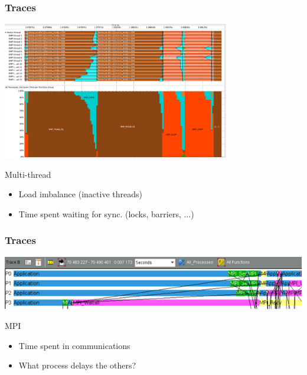 \documentclass[xcolor={x11names,svgnames}]{beamer}
\begin{document}
\begin{frame}
  \frametitle{Traces}

  \begin{center}
    \includegraphics[height=6cm]{vampir.png}
  \end{center}

\begin{block}{Multi-thread}
    \begin{itemize}
    \item Load imbalance (inactive threads)
    \item Time spent waiting for sync. (locks, barriers, ...)
    \end{itemize}
  \end{block}
  
\end{frame}


\begin{frame}
  \frametitle{Traces}

  \includegraphics[width=\textwidth]{trace_mpi.png}

  \begin{block}{MPI}
    \begin{itemize}
    \item Time spent in communications
    \item What process delays the others?
    \end{itemize}
  \end{block}  
\end{frame}

\end{document}
